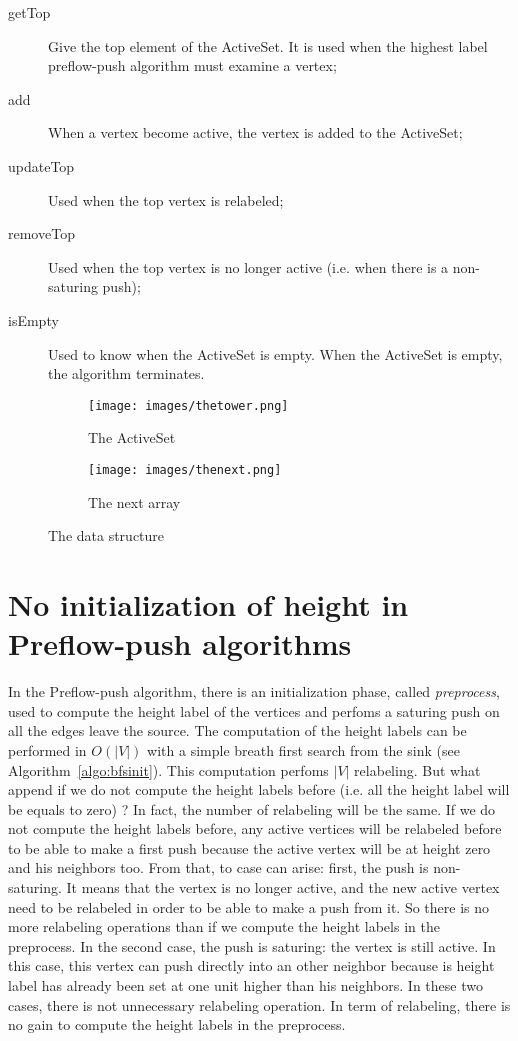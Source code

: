 \begin{description}
	\item[getTop] Give the top element of the ActiveSet. It is used when the highest label preflow-push algorithm must examine a vertex;
	\item[add] When a vertex become active, the vertex is added to the ActiveSet;
	\item[updateTop] Used when the top vertex is relabeled;
	\item[removeTop] Used when the top vertex is no longer active (i.e. when there is a non-saturing push);
	\item[isEmpty] Used to know when the ActiveSet is empty. When the ActiveSet is empty, the algorithm terminates.
\end{description}

\begin{figure}
\centering
\begin{subfigure}{.5\textwidth}
  \centering
  \texttt{[image: images/thetower.png]}
  \caption{The ActiveSet}
  \label{fig:tower}
\end{subfigure}%
\begin{subfigure}{.5\textwidth}
  \centering
  \texttt{[image: images/thenext.png]}
  \caption{The next array}
  \label{fig:next}
\end{subfigure}
\caption{The data structure}
\label{fig:TheTower}
\end{figure}

\section{No initialization of height in Preflow-push algorithms}
\label{sec:hauteurs}

In the Preflow-push algorithm, there is an initialization phase, called \textit{preprocess}, used to compute the height label of the vertices and perfoms a saturing push on all the edges leave the source. The computation of the height labels can be performed in $O(|V|)$ with a simple breath first search from the sink (see Algorithm~\ref{algo:bfsinit}). This computation perfoms $|V|$ relabeling. But what append if we do not compute the height labels before (i.e. all the height label will be equals to zero) ? In fact, the number of relabeling will be the same. If we do not compute the height labels before, any active vertices will be relabeled before to be able to make a first push because the active vertex will be at height zero and his neighbors too. From that, to case can arise: first, the push is non-saturing. It means that the vertex is no longer active, and the new active vertex need to be relabeled in order to be able to make a push from it. So there is no more relabeling operations than if we compute the height labels in the preprocess. In the second case, the push is saturing: the vertex is still active. In this case, this vertex can push directly into an other neighbor because is height label has already been set at one unit higher than his neighbors. In these two cases, there is not unnecessary relabeling operation. In term of relabeling, there is no gain to compute the height labels in the preprocess. \\

